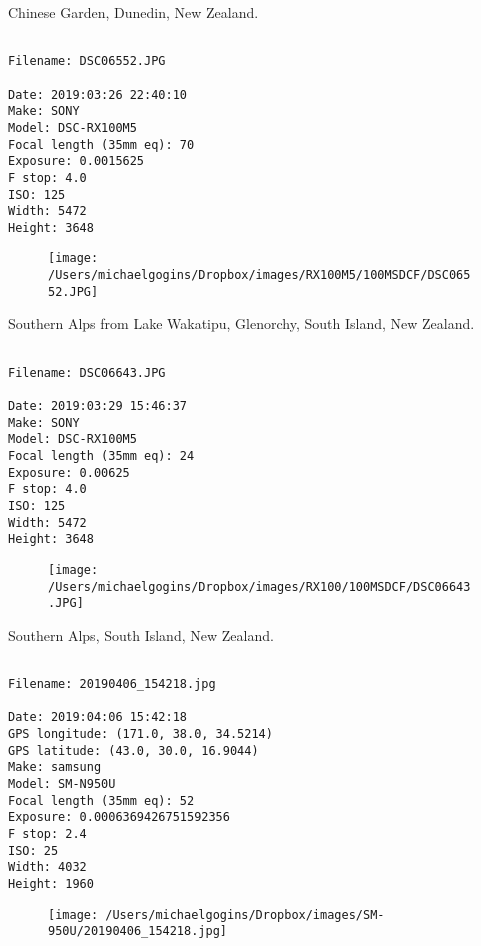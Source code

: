 \clearpage
\onecolumn
\noindent Chinese Garden, Dunedin, New Zealand.
\noindent
\begin{lstlisting}

Filename: DSC06552.JPG

Date: 2019:03:26 22:40:10
Make: SONY
Model: DSC-RX100M5
Focal length (35mm eq): 70
Exposure: 0.0015625
F stop: 4.0
ISO: 125
Width: 5472
Height: 3648
\end{lstlisting}
\clearpage

\begin{figure}
\texttt{[image: /Users/michaelgogins/Dropbox/images/RX100M5/100MSDCF/DSC06552.JPG]}
\end{figure}
    
\clearpage
\onecolumn
\noindent Southern Alps from Lake Wakatipu, Glenorchy, South Island, New Zealand.
\noindent
\begin{lstlisting}

Filename: DSC06643.JPG

Date: 2019:03:29 15:46:37
Make: SONY
Model: DSC-RX100M5
Focal length (35mm eq): 24
Exposure: 0.00625
F stop: 4.0
ISO: 125
Width: 5472
Height: 3648
\end{lstlisting}
\clearpage

\begin{figure}
\texttt{[image: /Users/michaelgogins/Dropbox/images/RX100/100MSDCF/DSC06643.JPG]}
\end{figure}
    
\clearpage
\onecolumn
\noindent Southern Alps, South Island, New Zealand.
\noindent
\begin{lstlisting}

Filename: 20190406_154218.jpg

Date: 2019:04:06 15:42:18
GPS longitude: (171.0, 38.0, 34.5214)
GPS latitude: (43.0, 30.0, 16.9044)
Make: samsung
Model: SM-N950U
Focal length (35mm eq): 52
Exposure: 0.0006369426751592356
F stop: 2.4
ISO: 25
Width: 4032
Height: 1960
\end{lstlisting}
\clearpage

\begin{figure}
\texttt{[image: /Users/michaelgogins/Dropbox/images/SM-950U/20190406\_154218.jpg]}
\end{figure}
    
